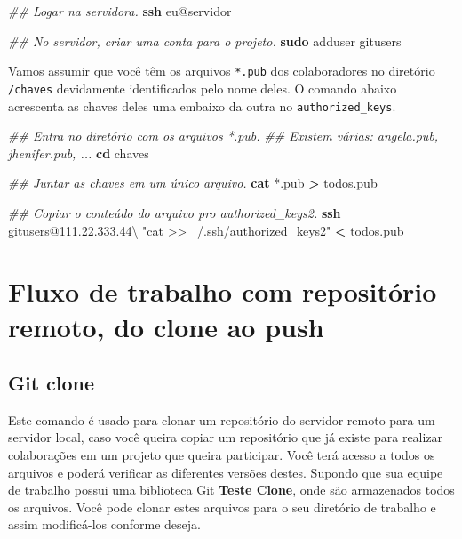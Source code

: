 \documentclass[
  a5paper,
  pagesize,
  9pt,
  pointlessnumbers,
  normalheadings,
  twoside=false
]{book}
\newenvironment{Shaded}{\begin{snugshade}}{\end{snugshade}}
\newcommand{\KeywordTok}[1]{\textcolor[rgb]{0.13,0.29,0.53}{\textbf{{#1}}}}
\newcommand{\StringTok}[1]{\textcolor[rgb]{0.31,0.60,0.02}{{#1}}}
\newcommand{\CommentTok}[1]{\textcolor[rgb]{0.56,0.35,0.01}{\textit{{#1}}}}
\newcommand{\NormalTok}[1]{{#1}}
\begin{document}
\begin{Shaded}
\begin{Highlighting}[]
\CommentTok{## Logar na servidora.}
\KeywordTok{ssh} \NormalTok{eu@servidor}

\CommentTok{## No servidor, criar uma conta para o projeto.}
\KeywordTok{sudo} \NormalTok{adduser gitusers}
\end{Highlighting}
\end{Shaded}

Vamos assumir que você têm os arquivos \texttt{*.pub} dos colaboradores
no diretório \texttt{/chaves} devidamente identificados pelo nome deles.
O comando abaixo acrescenta as chaves deles uma embaixo da outra no
\texttt{authorized\_keys}.

\begin{Shaded}
\begin{Highlighting}[]
\CommentTok{## Entra no diretório com os arquivos *.pub.}
\CommentTok{## Existem várias: angela.pub, jhenifer.pub, ...}
\KeywordTok{cd} \NormalTok{chaves}

\CommentTok{## Juntar as chaves em um único arquivo.}
\KeywordTok{cat} \NormalTok{*.pub }\KeywordTok{>} \NormalTok{todos.pub}

\CommentTok{## Copiar o conteúdo do arquivo pro authorized_keys2.}
\KeywordTok{ssh} \NormalTok{gitusers@111.22.333.44\textbackslash{}}
  \StringTok{"cat >> ~/.ssh/authorized_keys2"} \KeywordTok{<} \NormalTok{todos.pub}
\end{Highlighting}
\end{Shaded}

\section{Fluxo de trabalho com repositório remoto, do clone ao
push}\label{fluxo-de-trabalho-com-repositorio-remoto-do-clone-ao-push}

\subsection{Git clone}\label{git-clone}

Este comando é usado para clonar um repositório do servidor remoto para
um servidor local, caso você queira copiar um repositório que já existe
para realizar colaborações em um projeto que queira participar. Você
terá acesso a todos os arquivos e poderá verificar as diferentes versões
destes. Supondo que sua equipe de trabalho possui uma biblioteca Git
\textbf{Teste Clone}, onde são armazenados todos os arquivos. Você pode
clonar estes arquivos para o seu diretório de trabalho e assim
modificá-los conforme deseja.
\end{document}
